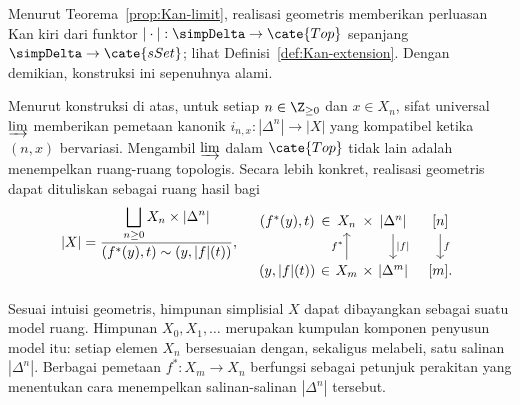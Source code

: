 \begin{remark}
	Menurut Teorema~\ref{prop:Kan-limit}, realisasi geometris memberikan
	perluasan Kan kiri dari funktor $|\cdot|:\simpDelta\to\cate{Top}$ sepanjang
	$\simpDelta\to\cate{sSet}$; lihat Definisi~\ref{def:Kan-extension}.
	Dengan demikian, konstruksi ini sepenuhnya alami.
\end{remark}

Menurut konstruksi di atas, untuk setiap $n\in\Z_{\geq0}$ dan $x\in X_n$,
sifat universal $\varinjlim$ memberikan pemetaan kanonik
$i_{n,x}:|\Delta^n|\to|X|$ yang kompatibel ketika $(n,x)$ bervariasi.
Mengambil $\varinjlim$ dalam $\cate{Top}$ tidak lain adalah menempelkan
ruang-ruang topologis. Secara lebih konkret, realisasi geometris dapat
dituliskan sebagai ruang hasil bagi
\begin{equation}\label{eqn:geom-realization-quotient}
	|X| = \dfrac{\displaystyle\bigsqcup_{n \geq 0} X_n \times |\Delta^n| }{(f^*(y), t) \sim (y, |f|(t)) }, \quad
	\begin{tikzcd}[column sep=tiny]
		(f^*(y), t) \arrow[phantom, r, "\in" description] & X_n \arrow[phantom, r, "\times" description] & {|\Delta^n|} \arrow[d, "{|f|}"] & {[n]} \arrow[d, "f"] \\
		(y, {|f|}(t)) \arrow[phantom, r, "\in" description] & X_m \arrow[phantom, r, "\times" description] \arrow[u, "{f^*}"] & {|\Delta^m|} & {[m]}.
	\end{tikzcd}
\end{equation}

Sesuai intuisi geometris, himpunan simplisial $X$ dapat dibayangkan sebagai
suatu model ruang. Himpunan $X_0,X_1,\ldots$ merupakan kumpulan komponen
penyusun model itu: setiap elemen $X_n$ bersesuaian dengan, sekaligus melabeli,
satu salinan $|\Delta^n|$. Berbagai pemetaan
$f^*:X_m\to X_n$ berfungsi sebagai petunjuk perakitan yang menentukan cara
menempelkan salinan-salinan $|\Delta^n|$ tersebut.


